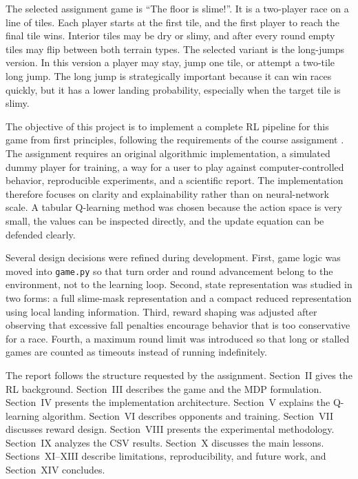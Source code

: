 \documentclass[conference]{IEEEtran}
\begin{document}
The selected assignment game is ``The floor is slime!''. It is a two-player race on
a line of tiles. Each player starts at the first tile, and the first player to
reach the final tile wins. Interior tiles may be dry or slimy, and after every
round empty tiles may flip between both terrain types. The selected variant is the
long-jumps version. In this version a player may stay, jump one tile, or attempt a
two-tile long jump. The long jump is strategically important because it can win
races quickly, but it has a lower landing probability, especially when the target
tile is slimy.

The objective of this project is to implement a complete RL pipeline for this game
from first principles, following the requirements of the course assignment
\cite{assignment2025}. The assignment requires an original algorithmic
implementation, a simulated dummy player for training, a way for a user to play
against computer-controlled behavior, reproducible experiments, and a scientific
report. The implementation therefore focuses on clarity and explainability rather
than on neural-network scale. A tabular Q-learning method was chosen because the
action space is very small, the values can be inspected directly, and the update
equation can be defended clearly.

Several design decisions were refined during development. First, game logic was
moved into \texttt{game.py} so that turn order and round advancement belong to the
environment, not to the learning loop. Second, state representation was studied in
two forms: a full slime-mask representation and a compact reduced representation
using local landing information. Third, reward shaping was adjusted after observing
that excessive fall penalties encourage behavior that is too conservative for a
race. Fourth, a maximum round limit was introduced so that long or stalled games
are counted as timeouts instead of running indefinitely.

The report follows the structure requested by the assignment. Section~II gives the
RL background. Section~III describes the game and the MDP formulation.
Section~IV presents the implementation architecture. Section~V explains the
Q-learning algorithm. Section~VI describes opponents and training. Section~VII
discusses reward design. Section~VIII presents the experimental methodology.
Section~IX analyzes the CSV results. Section~X discusses the main lessons.
Sections~XI--XIII describe limitations, reproducibility, and future work, and
Section~XIV concludes.
\end{document}
